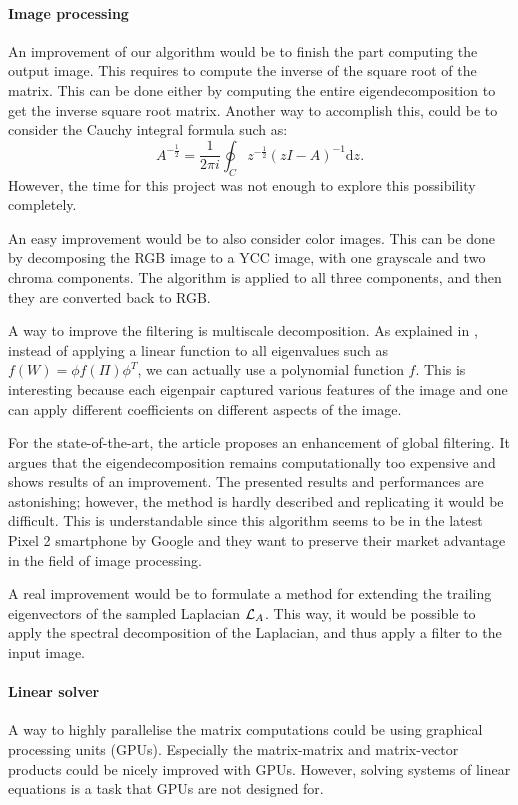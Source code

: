 \paragraph{Image processing}
An improvement of our algorithm would be to finish the part computing the output image.
This requires to compute the inverse of the square root of the matrix.
\ifthesis
 This can be done either by computing the entire eigendecomposition to get the inverse square root matrix.
 Another way to accomplish this, could be to consider the Cauchy integral formula such as:
 \[A^{-\frac{1}{2}} = \frac{1}{2\pi i} \oint_C z^{-\frac{1}{2}} (zI - A)^{-1} \mathrm{d}z.\]
 However, the time for this project was not enough to explore this possibility completely.
\fi

\ifthesis
 An easy improvement would be to also consider color images.
 This can be done by decomposing the RGB image to a YCC image, with one grayscale and two chroma components.
 The algorithm is applied to all three components, and then they are converted back to RGB.
\fi

A way to improve the filtering is multiscale decomposition.
As explained in \cite{talebi_nonlocal_2014}, instead of applying a linear function to all eigenvalues such as \(f(W) = \phi f(\Pi) \phi^T\), we can actually use a polynomial function \(f\).
This is interesting because each eigenpair captured various features of the image and one can apply different coefficients on different aspects of the image.

For the state-of-the-art, the article \cite{talebi_fast_2016} proposes an enhancement of global filtering.
It argues that the eigendecomposition remains computationally too expensive and shows results of an improvement.
The presented results and performances are astonishing; however, the method is hardly described and replicating it would be difficult.
This is understandable since this algorithm seems to be in the latest Pixel 2 smartphone by Google and they want to preserve their market advantage in the field of image processing.

A real improvement would be to formulate a method for extending the trailing eigenvectors of the sampled Laplacian \(\operatorname{\mathcal{L}}_A\).
This way, it would be possible to apply the spectral decomposition of the Laplacian, and thus apply a filter to the input image.

\paragraph{Linear solver}
A way to highly parallelise the matrix computations could be using graphical processing units (GPUs).
Especially the matrix-matrix and matrix-vector products could be nicely improved with GPUs.
However, solving systems of linear equations is a task that GPUs are not designed for.

